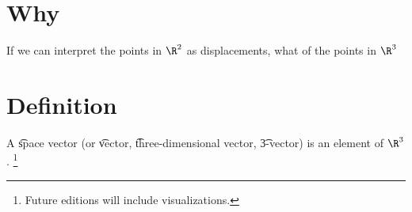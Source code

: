 
\section*{Why}

If we can interpret the points in $\R ^2$ as displacements, what of the points in $\R ^3$

\section*{Definition}

A \t{space vector} (or \t{vector}, \t{three-dimensional vector}, \t{3-vector}) is an element of $\R ^3$.
  \ifhmode\unskip\fi\footnote{
Future editions will include visualizations.
  }

\blankpage